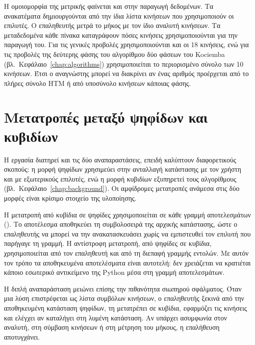 Η ομοιομορφία της μετρικής φαίνεται και στην παραγωγή δεδομένων. Τα ανακατέματα δημιουργούνται από την ίδια λίστα κινήσεων που χρησιμοποιούν οι επιλυτές. Ο επαληθευτής μετρά το μήκος με τον ίδιο αναλυτή κινήσεων. Τα μεταδεδομένα κάθε πίνακα καταγράφουν πόσες κινήσεις χρησιμοποιούνται για την παραγωγή του. Για τις γενικές προβολές χρησιμοποιούνται και οι 18 κινήσεις, ενώ για τις προβολές της δεύτερης φάσης του αλγορίθμου δύο φάσεων του Kociemba (βλ.~Κεφάλαιο~\ref{chap:algorithms}) χρησιμοποιείται το περιορισμένο σύνολο των 10 κινήσεων. Έτσι ο αναγνώστης μπορεί να διακρίνει αν ένας αριθμός προέρχεται από το πλήρες σύνολο HTM ή από υποσύνολο κινήσεων κάποιας φάσης.

\section{Μετατροπές μεταξύ ψηφίδων και κυβιδίων}
\label{sec:model-facelets}
Η εργασία διατηρεί και τις δύο αναπαραστάσεις, επειδή καλύπτουν διαφορετικούς σκοπούς: η μορφή ψηφίδων χρησιμεύει στην ανταλλαγή κατάστασης με τον χρήστη και με εξωτερικούς επιλυτές, ενώ η μορφή κυβιδίων εξυπηρετεί τους αλγορίθμους (βλ.~Κεφάλαιο~\ref{chap:background}). Οι αμφίδρομες μετατροπές ανάμεσα στις δύο μορφές είναι κρίσιμο στοιχείο της υλοποίησης.

Η μετατροπή από κυβίδια σε ψηφίδες χρησιμοποιείται σε κάθε γραμμή αποτελεσμάτων (). Το αποτέλεσμα αποθηκεύει τη συμβολοσειρά της αρχικής κατάστασης, ώστε ο επαληθευτής να μπορεί να την ανακατασκευάσει χωρίς να εμπιστευθεί τον επιλυτή που παρήγαγε τη γραμμή. Η αντίστροφη μετατροπή, από ψηφίδες σε κυβίδια, χρησιμοποιείται από τον επαληθευτή και από τη διεπαφή γραμμής εντολών. Με αυτόν τον τρόπο τα αποθηκευμένα αποτελέσματα είναι αυτοτελή: δεν χρειάζεται να κρατιέται κάποιο εσωτερικό αντικείμενο της Python μέσα στη γραμμή αποτελεσμάτων.

Η διπλή αναπαράσταση μειώνει επίσης την πιθανότητα σιωπηρού σφάλματος. Όταν μια λύση επιστρέφεται ως λίστα συμβόλων κινήσεων, ο επαληθευτής ξεκινά από την αποθηκευμένη κατάσταση ψηφίδων, τη μετατρέπει σε κυβίδια, εφαρμόζει τις κινήσεις και ελέγχει αν καταλήγει στη λυμένη κατάσταση. Αν υπάρχει ασυμφωνία στον αναλυτή, στη σύμβαση κινήσεων ή στη μέτρηση του μήκους, η επαλήθευση αποτυγχάνει.

